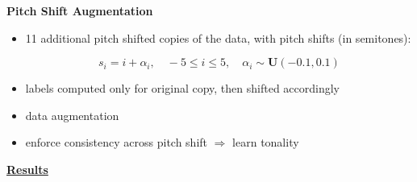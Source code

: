 \documentclass{beamer}
\newcommand{\emp}[1]{\textcolor{tum}{\textbf{#1}}}
\begin{document}
\begin{frame}[allowframebreaks]
	\framebreak

	\emp{Pitch Shift Augmentation}

	\begin{itemize}
		\item 11 additional pitch shifted copies of the data, with pitch shifts (in semitones):

		      \begin{equation*}
			      s_i = i + \alpha_i,\quad -5 \leq i \leq 5, \quad \alpha_i \sim \mathbf{U}(-0.1,0.1)
		      \end{equation*}

		\item labels computed only for original copy, then shifted accordingly
		\item data augmentation
		\item enforce consistency across pitch shift $\Rightarrow$ learn tonality
	\end{itemize}

	\href{https://benadar293.github.io/}{\textbf{Results}}

\end{frame}
\end{document}
